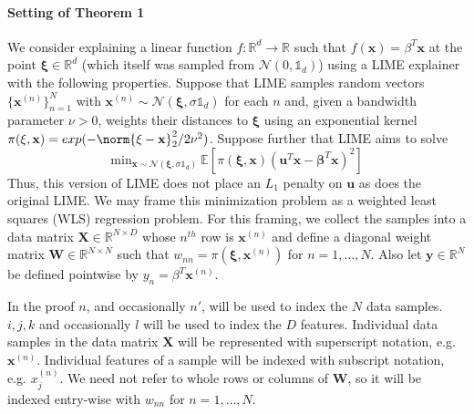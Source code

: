     \paragraph{Setting of Theorem 1}
        We consider explaining a linear function $f:\mathbb{R}^d \rightarrow \mathbb{R}$ such that $f(\mathbf{x}) = \beta^T \mathbf{x}$ at the point $\mathbf{\xi}\in \mathbb{R}^d$ (which itself was sampled from $\mathcal{N}(0, \mathds{1}_d)$) using a LIME explainer with the following properties. Suppose that LIME samples random vectors $\{\mathbf{x}^{(n)}\}_{n=1}^N$ with $\mathbf{x}^{(n)} \sim \mathcal{N}(\mathbf{\xi},\sigma \mathds{1}_d)$ for each $n$ and, given a bandwidth parameter $\nu > 0$, weights their distances to $\mathbf{\xi}$ using an exponential kernel $\pi(\xi,\mathbf{x}) = exp(-\norm{\mathbf{\xi} - \mathbf{x}}_2^2/2\nu^2)$. Suppose further that LIME aims to solve
        \begin{equation}
            \text{min}_{\mathbf{x}\sim\mathcal{N}(\mathbf{\xi},\sigma  \mathds{1}_d)}\ \mathds{E}[\pi(\mathbf{\xi},\mathbf{x})(\mathbf{u}^T \mathbf{x} - \mathbf{\beta}^T \mathbf{x})^2]
        \end{equation}
        Thus, this version of LIME does not place an $L_1$ penalty on $\mathbf{u}$ as does the original LIME. We may frame this minimization problem as a weighted least squares (WLS) regression problem. For this framing, we collect the samples into a data matrix $\mathbf{X} \in \mathbb{R}^{N\times D}$ whose $n^{th}$ row is $\mathbf{x}^{(n)}$ and define a diagonal weight matrix $\mathbf{W}\in \mathbb{R}^{N \times N}$ such that $w_{nn} = \pi(\mathbf{\xi},\mathbf{x}^{(n)})$ for $n=1,\ldots, N$. Also let $\mathbf{y}\in \mathbb{R}^N$ be defined pointwise by $y_n = \beta^T \mathbf{x}^{(n)}$.

        In the proof $n$, and occasionally $n'$, will be used to index the $N$ data samples. $i,j,k$ and occasionally $l$ will be used to index the $D$ features. Individual data samples in the data matrix $\mathbf{X}$ will be represented with superscript notation, e.g. $\mathbf{x}^{(n)}$. Individual features of a sample will be indexed with subscript notation, e.g. $x^{(n)}_j$. We need not refer to whole rows or columns of $\mathbf{W}$, so it will be indexed entry-wise with $w_{nn}$ for $n=1,\ldots, N$.
    
